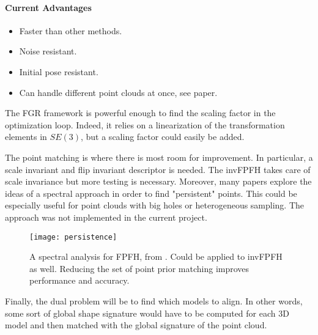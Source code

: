 \documentclass[10pt,a4paper]{article}
\begin{document}
\paragraph{Current Advantages}
\begin{itemize}
	\item Faster than other methods.
	\item Noise resistant.
	\item Initial pose resistant.  
	\item Can handle different point clouds at once, see paper.  
\end{itemize}

The FGR framework is powerful enough to find the scaling factor in the optimization loop. Indeed, it relies on a linearization of the transformation elements in $SE(3)$, but a scaling factor could easily be added. 

The point matching is where there is most room for improvement. In particular, a scale invariant and flip invariant descriptor is needed. The invFPFH takes care of scale invariance but more testing is necessary. Moreover, many papers explore the ideas of a spectral approach in order to find "persistent" points. This could be especially useful for point clouds with big holes or heterogeneous sampling. The approach was not implemented in the current project. 

\begin{figure}[h!]
	\centering
	\texttt{[image: persistence]}
	\caption{A spectral analysis for FPFH, from \cite{rusu2009fast}. Could be applied to invFPFH as well. Reducing the set of point prior matching improves performance and accuracy.}
	\label{fig:persistence}
\end{figure}

Finally, the dual problem will be to find which models to align. In other words, some sort of global shape signature would have to be computed for each 3D model and then matched with the global signature of the point cloud. 

%
%


%  

\end{document}
